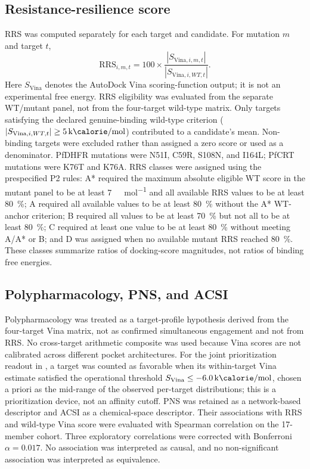 \documentclass[journal=jcisd8,manuscript=article]{achemso}
\begin{document}
\subsection{Resistance-resilience score}
RRS was computed separately for each target and candidate. For mutation $m$ and target $t$,
\begin{equation}
\mathrm{RRS}_{i,m,t}=100\times\frac{|S_{\mathrm{Vina},i,m,t}|}{|S_{\mathrm{Vina},i,WT,t}|}.
\label{eq:rrs}
\end{equation}
Here $S_{\mathrm{Vina}}$ denotes the AutoDock Vina scoring-function output; it is not an experimental free energy. RRS eligibility was evaluated from the separate WT/mutant panel, not from the four-target wild-type matrix. Only targets satisfying the declared genuine-binding wild-type criterion ($|S_{\mathrm{Vina},i,WT,t}|\geq\qty{5}{\kilo\calorie\per\mole}$) contributed to a candidate's mean. Non-binding targets were excluded rather than assigned a zero score or used as a denominator. PfDHFR mutations were N51I, C59R, S108N, and I164L; PfCRT mutations were K76T and K76A. RRS classes were assigned using the prespecified P2 rules: A* required the maximum absolute eligible WT score in the mutant panel to be at least \qty{7}{\kilo\calorie\per\mole} and all available RRS values to be at least \qty{80}{\percent}; A required all available values to be at least \qty{80}{\percent} without the A* WT-anchor criterion; B required all values to be at least \qty{70}{\percent} but not all to be at least \qty{80}{\percent}; C required at least one value to be at least \qty{80}{\percent} without meeting A/A* or B; and D was assigned when no available mutant RRS reached \qty{80}{\percent}. These classes summarize ratios of docking-score magnitudes, not ratios of binding free energies.

\subsection{Polypharmacology, PNS, and ACSI}
Polypharmacology was treated as a target-profile hypothesis derived from the four-target Vina matrix, not as confirmed simultaneous engagement and not from RRS. No cross-target arithmetic composite was used because Vina scores are not calibrated across different pocket architectures. For the joint prioritization readout in , a target was counted as favorable when its within-target Vina estimate satisfied the operational threshold $S_{\mathrm{Vina}}\leq\qty{-6.0}{\kilo\calorie\per\mole}$, chosen a priori as the mid-range of the observed per-target distributions; this is a prioritization device, not an affinity cutoff. PNS was retained as a network-based descriptor and ACSI as a chemical-space descriptor. Their associations with RRS and wild-type Vina score were evaluated with Spearman correlation on the 17-member cohort. Three exploratory correlations were corrected with Bonferroni $\alpha=\num{0.017}$. No association was interpreted as causal, and no non-significant association was interpreted as equivalence.
\end{document}
